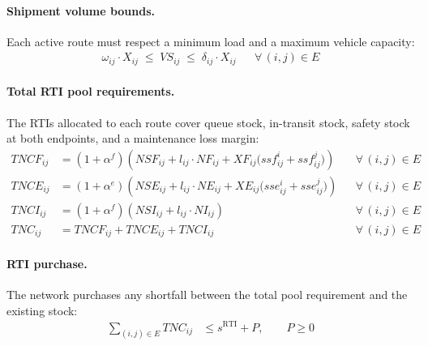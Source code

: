 \paragraph{Shipment volume bounds.}
Each active route must respect a minimum load and a maximum
vehicle capacity:
%
\begin{align}
  \omega_{ij} \cdot X_{ij}
  \;\leq\; VS_{ij}
  \;\leq\; \delta_{ij} \cdot X_{ij}
  && \forall\,(i,j)\in E
  \label{eq:vol-bounds}
\end{align}


\paragraph{Total RTI pool requirements.}
The RTIs allocated to each route cover queue stock, in-transit
stock, safety stock at both endpoints, and a maintenance loss margin:
%
\begin{align}
  TNCF_{ij}
  &= (1+\alpha^{f})\!\left(
       NSF_{ij}
       + l_{ij}\cdot NF_{ij}
       + XF_{ij}\bigl(ssf^{i}_{ij}+ssf^{j}_{ij}\bigr)
     \right)
  && \forall\,(i,j)\in E
  \label{eq:pool-full}\\[4pt]
  TNCE_{ij}
  &= (1+\alpha^{e})\!\left(
       NSE_{ij}
       + l_{ij}\cdot NE_{ij}
       + XE_{ij}\bigl(sse^{i}_{ij}+sse^{j}_{ij}\bigr)
     \right)
  && \forall\,(i,j)\in E
  \label{eq:pool-empty}\\[4pt]
  TNCI_{ij}
  &= (1+\alpha^{f})\!\left(
       NSI_{ij}
       + l_{ij}\cdot NI_{ij}
     \right)
  && \forall\,(i,j)\in E
  \label{eq:pool-inlay}\\[4pt]
  TNC_{ij}
  &= TNCF_{ij} + TNCE_{ij} + TNCI_{ij}
  && \forall\,(i,j)\in E
  \label{eq:pool-total}
\end{align}


\paragraph{RTI purchase.}
The network purchases any shortfall between the total pool
requirement and the existing stock:
%
\begin{align}
  \sum_{(i,j)\in E} TNC_{ij}
  &\leq s^{\text{RTI}} + P,
  \qquad P \geq 0
  \label{eq:purchase}
\end{align}


